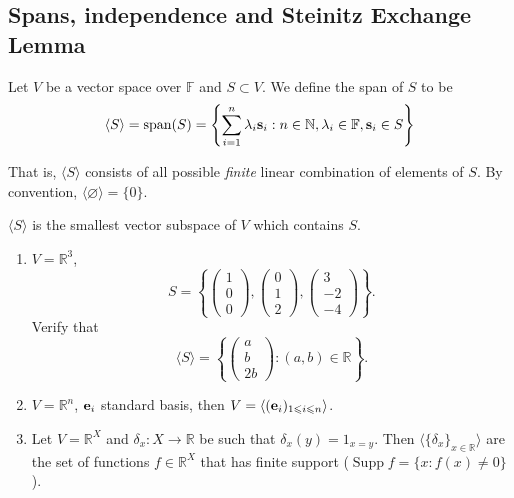 \documentclass[a4paper,11pt]{article}
\begin{document}
\subsection{Spans, independence and Steinitz Exchange Lemma}
\begin{definition}
    Let $V$ be a vector space over $\mathbb F$ and $S\subset V$.
    We define the span of $S$ to be
    $$\langle S\rangle=\operatorname{span}(S)=\left\{\sum_{i=1}^n\lambda_i{\bf s}_i:n\in\mathbb N,\lambda_i\in \mathbb F,{\bf s}_i\in S\right\}$$
\end{definition}
That is, $\langle S\rangle$ consists of all possible \textit{finite} linear combination of elements of $S$.
By convention, $\langle \varnothing\rangle=\{0\}$.
\begin{remark}
    $ \langle S \rangle  $ is the smallest vector subspace of $V$ which contains $S$.
\end{remark}
\begin{example}
    \begin{enumerate}
        \item $V=\mathbb{R}^{3}$,
        \[
            S = \left\{\begin{pmatrix}
                1 \\ 0 \\ 0
            \end{pmatrix}, \begin{pmatrix}
                0 \\ 1 \\ 2
            \end{pmatrix}, \begin{pmatrix}
                3 \\ -2 \\ -4
            \end{pmatrix}\right\}.
        \]
        Verify that 
        \[
            \langle S \rangle = \left\{ \begin{pmatrix}
                a \\ b \\ 2b
            \end{pmatrix}:(a,b)\in \mathbb{R} \right\}.
        \]
        \item $ V = \mathbb{R}^{n} $, ${\bf e}_i$ standard basis, then $ V = \langle ({\bf e}_i)_{1\leqslant i\leqslant n} \rangle  $.
        \item Let $V=\mathbb R^X$ and $\delta_x:X\to\mathbb R$ be such that $\delta_x(y)=1_{x=y}$.
        Then $\langle \{\delta_x\}_{x\in\mathbb R}\rangle$ are the set of functions $f\in\mathbb R^X$ that has finite support ($ \operatorname{Supp} f = \{x:f(x)\neq 0\} $).
    \end{enumerate}
\end{example}
\end{document}
